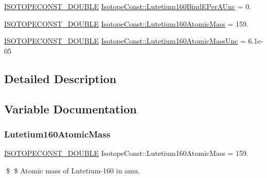 \begin{DoxyCompactItemize}
\mbox{\hyperlink{group___isotope_const-_macros_ga8f45a7272ce02c0b4c65c44636ed719a}{I\+S\+O\+T\+O\+P\+E\+C\+O\+N\+S\+T\+\_\+\+D\+O\+U\+B\+LE}} \mbox{\hyperlink{group___isotope_const-_lutetium-_lu160_gafd4efd950160b143496bba4b92047c61}{Isotope\+Const\+::\+Lutetium160\+Bind\+E\+Per\+A\+Unc}} = 0.
\item 
\mbox{\hyperlink{group___isotope_const-_macros_ga8f45a7272ce02c0b4c65c44636ed719a}{I\+S\+O\+T\+O\+P\+E\+C\+O\+N\+S\+T\+\_\+\+D\+O\+U\+B\+LE}} \mbox{\hyperlink{group___isotope_const-_lutetium-_lu160_gae4fadd273799ecb22b6e4f9d0a951644}{Isotope\+Const\+::\+Lutetium160\+Atomic\+Mass}} = 159.
\item 
\mbox{\hyperlink{group___isotope_const-_macros_ga8f45a7272ce02c0b4c65c44636ed719a}{I\+S\+O\+T\+O\+P\+E\+C\+O\+N\+S\+T\+\_\+\+D\+O\+U\+B\+LE}} \mbox{\hyperlink{group___isotope_const-_lutetium-_lu160_gaceb55330341e1447dc6598782937e590}{Isotope\+Const\+::\+Lutetium160\+Atomic\+Mass\+Unc}} = 6.\+1e-\/05
\end{DoxyCompactItemize}


\subsection{Detailed Description}


\subsection{Variable Documentation}
\mbox{\label{group___isotope_const-_lutetium-_lu160_gae4fadd273799ecb22b6e4f9d0a951644}} 
\subsubsection{\texorpdfstring{Lutetium160\+Atomic\+Mass}{Lutetium160AtomicMass}}
{\footnotesize\ttfamily \mbox{\hyperlink{group___isotope_const-_macros_ga8f45a7272ce02c0b4c65c44636ed719a}{I\+S\+O\+T\+O\+P\+E\+C\+O\+N\+S\+T\+\_\+\+D\+O\+U\+B\+LE}} Isotope\+Const\+::\+Lutetium160\+Atomic\+Mass = 159.}

\$ \$ Atomic mass of Lutetium-\/160 in amu. \mbox{\label{group___isotope_const-_lutetium-_lu160_gaceb55330341e1447dc6598782937e590}} 

